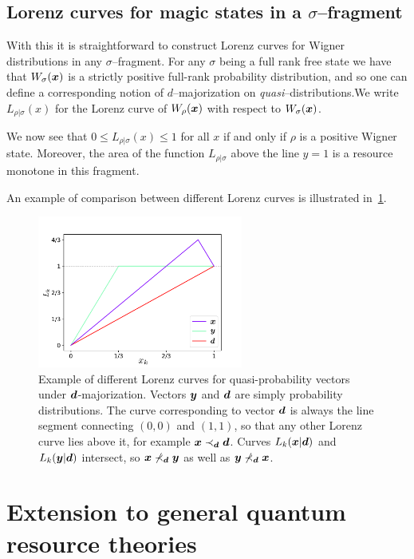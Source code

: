 \documentclass[pra,
aps,
twocolumn,
superscriptaddress,
groupedaddress,
nofootinbib,
reprint
]{revtex4-1}
\begin{document}
\subsection{Lorenz curves for magic states in a $\sigma$--fragment}
With this it is straightforward to construct Lorenz curves for Wigner distributions in any $\sigma$--fragment. For any $\sigma$ being a full rank free state we have that $W_\sigma(\bm{x}) $ is a strictly positive full-rank probability distribution, and so one can define a corresponding notion of $d$--majorization on \emph{quasi}--distributions.We write $L_{\rho|\sigma}(x)$ for the Lorenz curve of $W_\rho(\bm{x})$ with respect to $W_\sigma(\bm{x})$. 

We now see that $0\le L_{\rho |\sigma}(x) \le 1$ for all $x$ if and only if $\rho$ is a positive Wigner state. Moreover, the area of the function $L_{\rho|\sigma}$ above the line $y=1$ is a resource monotone in this fragment. 

An example of comparison between different Lorenz curves is illustrated in~\cref{fig:lctoy}.
\begin{figure}
    \centering
    \includegraphics[height=5cm]{figs/lctoy.pdf}
    \caption{Example of different Lorenz curves for quasi-probability vectors under $\bm{d}$-majorization.
    Vectors $\bm{y}$ and $\bm{d}$ are simply probability distributions.
    The curve corresponding to vector $\bm{d}$ is always the line segment connecting $(0,0)$ and $(1,1)$, so that any other Lorenz curve lies above it, for example $\bm{x} \prec_{\bm{d}} \bm{d}$.
    Curves $L_k(\bm{x}|\bm{d})$ and $L_k(\bm{y}|\bm{d})$ intersect, so $\bm{x} \nprec_{\bm{d}} \bm{y}$ as well as $\bm{y} \nprec_{\bm{d}} \bm{x}$.
    }
    \label{fig:lctoy}
\end{figure}


\section{Extension to general quantum resource theories}
\label{sec:frag}
\end{document}
